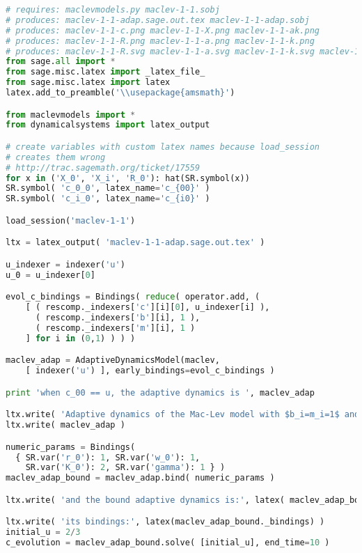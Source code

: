 \begin{lstlisting}[language=Python]
# requires: maclevmodels.py maclev-1-1.sobj
# produces: maclev-1-1-adap.sage.out.tex maclev-1-1-adap.sobj
# produces: maclev-1-1-c.png maclev-1-1-X.png maclev-1-1-ak.png
# produces: maclev-1-1-R.png maclev-1-1-a.png maclev-1-1-k.png
# produces: maclev-1-1-R.svg maclev-1-1-a.svg maclev-1-1-k.svg maclev-1-1-c.svg
from sage.all import *
from sage.misc.latex import _latex_file_
from sage.misc.latex import latex
latex.add_to_preamble('\\usepackage{amsmath}')

from maclevmodels import *
from dynamicalsystems import latex_output

# create variables with custom latex names because load_session
# creates them wrong
# http://trac.sagemath.org/ticket/17559
for x in ('X_0', 'X_i', 'R_0'): hat(SR.symbol(x))
SR.symbol( 'c_0_0', latex_name='c_{00}' )
SR.symbol( 'c_i_0', latex_name='c_{i0}' )

load_session('maclev-1-1')

ltx = latex_output( 'maclev-1-1-adap.sage.out.tex' )

u_indexer = indexer('u')
u_0 = u_indexer[0]

evol_c_bindings = Bindings( reduce( operator.add, (
    [ ( rescomp._indexers['c'][i][0], u_indexer[i] ),
      ( rescomp._indexers['b'][i], 1 ),
      ( rescomp._indexers['m'][i], 1 )
    ] for i in (0,1) ) ) )

maclev_adap = AdaptiveDynamicsModel(maclev,
    [ indexer('u') ], early_bindings=evol_c_bindings )

print 'when c_00 == u, the adaptive dynamics is ', maclev_adap

ltx.write( 'Adaptive dynamics of the Mac-Lev model with $b_i=m_i=1$ and $c_{i0} = u_i$:' )
ltx.write( maclev_adap )

numeric_params = Bindings(
  { SR.var('r_0'): 1, SR.var('w_0'): 1,
    SR.var('K_0'): 2, SR.var('gamma'): 1 } )
maclev_adap_bound = maclev_adap.bind( numeric_params )

ltx.write( 'and the bound adaptive dynamics is:', latex( maclev_adap_bound ) )

ltx.write( 'its bindings:', latex(maclev_adap_bound._bindings) )
initial_u = 2/3
c_evolution = maclev_adap_bound.solve( [initial_u], end_time=10 )


\end{lstlisting}
